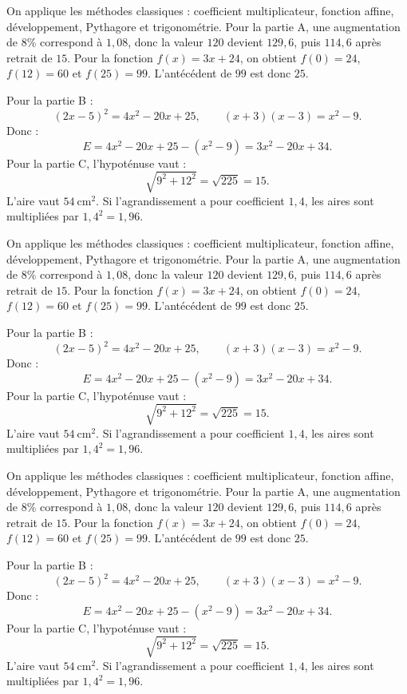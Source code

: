 \documentclass[11pt,a4paper]{article}
\newcounter{correction}
\begin{document}
\begin{correction}
On applique les méthodes classiques : coefficient multiplicateur, fonction affine, développement, Pythagore et trigonométrie. Pour la partie A, une augmentation de $8\%$ correspond à $1{,}08$, donc la valeur $120$ devient $129{,}6$, puis $114{,}6$ après retrait de $15$. Pour la fonction $f(x)=3x+24$, on obtient $f(0)=24$, $f(12)=60$ et $f(25)=99$. L'antécédent de $99$ est donc $25$.

Pour la partie B :
\[
(2x-5)^2=4x^2-20x+25,
\qquad
(x+3)(x-3)=x^2-9.
\]
Donc :
\[
E=4x^2-20x+25-(x^2-9)=3x^2-20x+34.
\]
Pour la partie C, l'hypoténuse vaut :
\[
\sqrt{9^2+12^2}=\sqrt{225}=15.
\]
L'aire vaut $54\ \mathrm{cm^2}$. Si l'agrandissement a pour coefficient $1{,}4$, les aires sont multipliées par $1{,}4^2=1{,}96$.
\end{correction}
\begin{correction}
On applique les méthodes classiques : coefficient multiplicateur, fonction affine, développement, Pythagore et trigonométrie. Pour la partie A, une augmentation de $8\%$ correspond à $1{,}08$, donc la valeur $120$ devient $129{,}6$, puis $114{,}6$ après retrait de $15$. Pour la fonction $f(x)=3x+24$, on obtient $f(0)=24$, $f(12)=60$ et $f(25)=99$. L'antécédent de $99$ est donc $25$.

Pour la partie B :
\[
(2x-5)^2=4x^2-20x+25,
\qquad
(x+3)(x-3)=x^2-9.
\]
Donc :
\[
E=4x^2-20x+25-(x^2-9)=3x^2-20x+34.
\]
Pour la partie C, l'hypoténuse vaut :
\[
\sqrt{9^2+12^2}=\sqrt{225}=15.
\]
L'aire vaut $54\ \mathrm{cm^2}$. Si l'agrandissement a pour coefficient $1{,}4$, les aires sont multipliées par $1{,}4^2=1{,}96$.
\end{correction}
\begin{correction}
On applique les méthodes classiques : coefficient multiplicateur, fonction affine, développement, Pythagore et trigonométrie. Pour la partie A, une augmentation de $8\%$ correspond à $1{,}08$, donc la valeur $120$ devient $129{,}6$, puis $114{,}6$ après retrait de $15$. Pour la fonction $f(x)=3x+24$, on obtient $f(0)=24$, $f(12)=60$ et $f(25)=99$. L'antécédent de $99$ est donc $25$.

Pour la partie B :
\[
(2x-5)^2=4x^2-20x+25,
\qquad
(x+3)(x-3)=x^2-9.
\]
Donc :
\[
E=4x^2-20x+25-(x^2-9)=3x^2-20x+34.
\]
Pour la partie C, l'hypoténuse vaut :
\[
\sqrt{9^2+12^2}=\sqrt{225}=15.
\]
L'aire vaut $54\ \mathrm{cm^2}$. Si l'agrandissement a pour coefficient $1{,}4$, les aires sont multipliées par $1{,}4^2=1{,}96$.
\end{correction}
\end{document}

